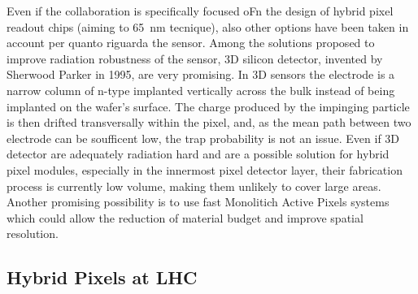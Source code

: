     Even if the collaboration is specifically focused oFn the design of hybrid pixel readout chips (aiming to \SI{65}{nm} tecnique), also other options have been taken in account per quanto riguarda the sensor. 
    Among the solutions proposed to improve radiation robustness of the sensor, 3D silicon detector, invented by Sherwood Parker in 1995, are very promising.
    In 3D sensors the electrode is a narrow column of n-type implanted vertically across the bulk instead of being implanted on the wafer's surface. 
    The charge produced by the impinging particle is then drifted transversally within the pixel, and, as the mean path between two electrode can be soufficent low, the trap probability is not an issue. 
    Even if 3D detector are adequately radiation hard and are a possible solution for hybrid pixel modules, especially in the innermost pixel detector layer, their fabrication process is currently low volume, making them unlikely to cover large areas.
    Another promising possibility is to use fast Monolitich Active Pixels systems which could allow the reduction of material budget and improve spatial resolution.


    \subsection{Hybrid Pixels at LHC}
